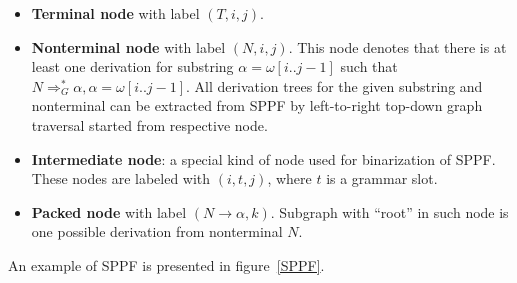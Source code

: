 \begin{itemize}
    \item \textbf{Terminal node} with label $(T, i, j)$.
    \item \textbf{Nonterminal node} with label $(N, i, j)$. 
    This node denotes that there is at least one derivation for substring $\alpha=\omega[i..j-1]$ such that $N \Rightarrow^*_G \alpha, \alpha = \omega[i..j-1] $.
    All derivation trees for the given substring and nonterminal can be extracted from SPPF by left-to-right top-down graph traversal started from respective node.     
    \item \textbf{Intermediate node}: a special kind of node used for binarization of SPPF. These nodes are labeled with $(i,t,j)$, where $t$ is a grammar slot.
    \item \textbf{Packed node} with label $(N \rightarrow \alpha, k)$. 
    Subgraph with ``root'' in such node is one possible derivation from nonterminal $N$.

\end{itemize}

An example of SPPF is presented in figure~\ref{SPPF}.
